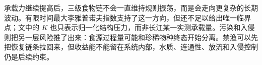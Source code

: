 承载力继续提高后，三级食物链不会一直维持规则振荡，而是会走向更复杂的长期波动。有限时间最大李雅普诺夫指数支持了这一方向，但还不足以给出唯一临界点；文中的 $K$ 也只表示归一化结构压力，而非长江某一实测承载量。污染和入侵则把另一层风险推了出来：食源过程量可能和珍稀物种终态开始分离。禁渔可以先把恢复链条拉回来，但收益能不能留在系统内部，水质、连通性、放流和入侵控制仍是后续约束。

